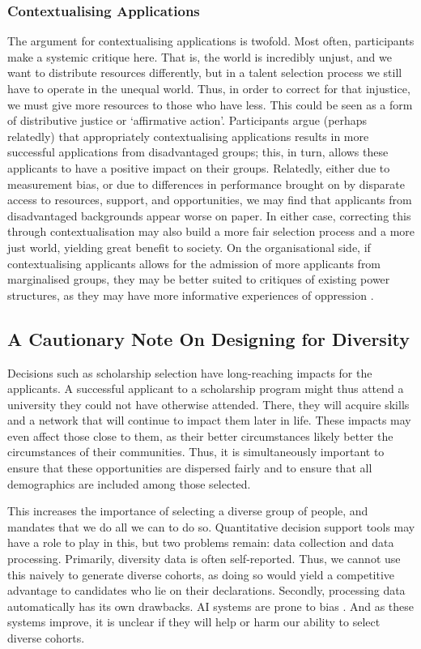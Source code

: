 \subsubsection{Contextualising Applications}
The argument for contextualising applications is twofold. Most often, participants make a systemic critique here. That is, the world is incredibly unjust, and we want to distribute resources differently, but in a talent selection process we still have to operate in the unequal world. Thus, in order to correct for that injustice, we must give more resources to those who have less. This could be seen as a form of distributive justice or `affirmative action'. Participants argue (perhaps relatedly) that appropriately contextualising applications results in more successful applications from disadvantaged groups; this, in turn, allows these applicants to have a positive impact on their groups. Relatedly, either due to measurement bias, or due to differences in performance brought on by disparate access to resources, support, and opportunities, we may find that applicants from disadvantaged backgrounds appear worse on paper. In either case, correcting this through contextualisation may also build a more fair selection process and a more just world, yielding great benefit to society. On the organisational side, if contextualising applicants allows for the admission of more applicants from marginalised groups, they may be better suited to critiques of existing power structures, as they may have more informative experiences of oppression \cite{mills2015blackness}.

\subsection{A Cautionary Note On Designing for Diversity}
Decisions such as scholarship selection have long-reaching impacts for the applicants. A successful applicant to a scholarship program might thus attend a university they could not have otherwise attended. There, they will acquire skills and a network that will continue to impact them later in life. These impacts may even affect those close to them, as their better circumstances likely better the circumstances of their communities. Thus, it is simultaneously important to ensure that these opportunities are dispersed fairly and to ensure that all demographics are included among those selected.

This increases the importance of selecting a diverse group of people, and mandates that we do all we can to do so. Quantitative decision support tools may have a role to play in this, but two problems remain: data collection and data processing. Primarily, diversity data is often self-reported. Thus, we cannot use this naively to generate diverse cohorts, as doing so would yield a competitive advantage to candidates who lie on their declarations. Secondly, processing data automatically has its own drawbacks. AI systems are prone to bias \cite{Friedler_Scheidegger_Venkatasubramanian_2016}. And as these systems improve, it is unclear if they will help or harm our ability to select diverse cohorts.

